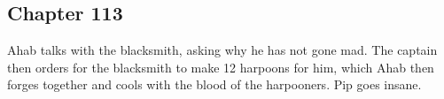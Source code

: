 \subsection{Chapter 113}

Ahab talks with the blacksmith, asking why he has not gone mad. The captain
then orders for the blacksmith to make 12 harpoons for him, which Ahab then
forges together and cools with the blood of the harpooners. Pip goes insane.
